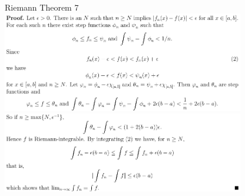 \documentclass[3pt,landscape]{article}
\begin{document}
\begin{multicols}{2}
    Riemann Theorem 7
    \includegraphics[width=400]{R_t7a.png} \\
    \includegraphics[width=400]{R_t7b.png} \\


\end{multicols}
\end{document}
